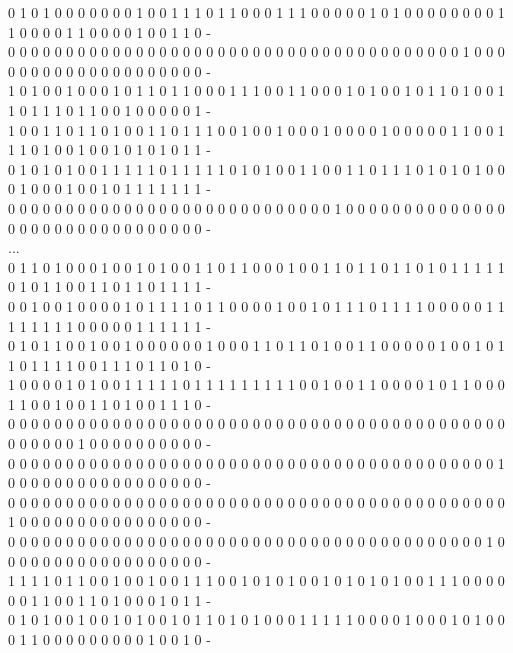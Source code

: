 \begin{center}
{0 1 0 1 0 0 0 0 0 0 0 1 0 0 1 1 1 0 1 1 0 0 0 1 1 1 0 0 0 0 0 1 0 1 0 0 0 0 0 0 0 0 1 1 0 0 0 0 1 1 0 0 0 0 1 0 0 1 1 0 -\\ 
0 0 0 0 0 0 0 0 0 0 0 0 0 0 0 0 0 0 0 0 0 0 0 0 0 0 0 0 0 0 0 0 0 0 0 0 0 0 0 1 0 0 0 0 0 0 0 0 0 0 0 0 0 0 0 0 0 0 0 0 -\\ 
1 0 1 0 0 1 0 0 0 1 0 1 1 0 1 1 0 0 0 1 1 1 0 0 1 1 0 0 0 1 0 1 0 0 1 0 1 1 0 1 0 0 1 1 0 1 1 1 0 1 1 0 0 1 0 0 0 0 0 1 -\\ 
1 0 0 1 1 0 1 1 0 1 0 0 1 1 0 1 1 1 0 0 1 0 0 1 0 0 0 1 0 0 0 0 1 0 0 0 0 0 1 1 0 0 1 1 1 0 1 0 0 1 0 0 1 0 1 0 1 0 1 1 -\\ 
0 1 0 1 0 1 0 0 1 1 1 1 1 0 1 1 1 1 1 0 1 0 1 0 0 1 1 0 0 1 1 0 1 1 1 0 1 0 1 0 1 0 0 0 1 0 0 0 1 0 0 1 0 1 1 1 1 1 1 1 -\\ 
0 0 0 0 0 0 0 0 0 0 0 0 0 0 0 0 0 0 0 0 0 0 0 0 0 0 0 0 1 0 0 0 0 0 0 0 0 0 0 0 0 0 0 0 0 0 0 0 0 0 0 0 0 0 0 0 0 0 0 0 -\\ 
...\\
0 1 1 0 1 0 0 0 1 0 0 1 0 1 0 0 1 1 0 1 1 0 0 0 1 0 0 1 1 0 1 1 0 1 1 0 1 0 1 1 1 1 1 0 1 0 1 1 0 0 1 1 0 1 1 0 1 1 1 1 -\\ 
0 0 1 0 0 1 0 0 0 0 1 0 1 1 1 1 0 1 1 0 0 0 0 1 0 0 1 0 1 1 1 0 1 1 1 1 0 0 0 0 0 1 1 1 1 1 1 1 1 0 0 0 0 0 1 1 1 1 1 1 -\\ 
0 1 0 1 1 0 0 1 0 0 1 0 0 0 0 0 0 1 0 0 0 1 1 0 1 1 0 1 0 0 1 1 0 0 0 0 0 1 0 0 1 0 1 1 0 1 1 1 1 0 0 1 1 1 0 1 1 0 1 0 -\\ 
1 0 0 0 0 1 0 1 0 0 1 1 1 1 1 0 1 1 1 1 1 1 1 1 1 0 0 1 0 0 1 1 0 0 0 0 1 0 1 1 0 0 0 1 1 0 0 1 0 0 1 1 0 1 0 0 1 1 1 0 -\\ 
0 0 0 0 0 0 0 0 0 0 0 0 0 0 0 0 0 0 0 0 0 0 0 0 0 0 0 0 0 0 0 0 0 0 0 0 0 0 0 0 0 0 0 0 0 0 0 0 0 1 0 0 0 0 0 0 0 0 0 0 -\\ 
0 0 0 0 0 0 0 0 0 0 0 0 0 0 0 0 0 0 0 0 0 0 0 0 0 0 0 0 0 0 0 0 0 0 0 0 0 0 0 0 0 0 1 0 0 0 0 0 0 0 0 0 0 0 0 0 0 0 0 0 -\\ 
0 0 0 0 0 0 0 0 0 0 0 0 0 0 0 0 0 0 0 0 0 0 0 0 0 0 0 0 0 0 0 0 0 0 0 0 0 0 0 0 0 0 0 1 0 0 0 0 0 0 0 0 0 0 0 0 0 0 0 0 -\\ 
0 0 0 0 0 0 0 0 0 0 0 0 0 0 0 0 0 0 0 0 0 0 0 0 0 0 0 0 0 0 0 0 0 0 0 0 0 0 0 0 0 1 0 0 0 0 0 0 0 0 0 0 0 0 0 0 0 0 0 0 -\\ 
1 1 1 1 0 1 1 0 0 1 0 0 1 0 0 1 1 1 0 0 1 0 1 0 1 0 0 1 0 1 0 1 0 1 0 0 1 1 1 0 0 0 0 0 0 1 1 0 0 1 1 0 1 0 0 0 1 0 1 1 -\\ 
0 1 0 1 0 0 1 0 0 1 0 1 0 0 1 0 1 1 0 1 0 1 0 0 0 1 1 1 1 1 0 0 0 0 1 0 0 0 1 0 1 0 0 0 1 1 0 0 0 0 0 0 0 0 0 1 0 0 1 0 -\\ 
}
\end{center}
